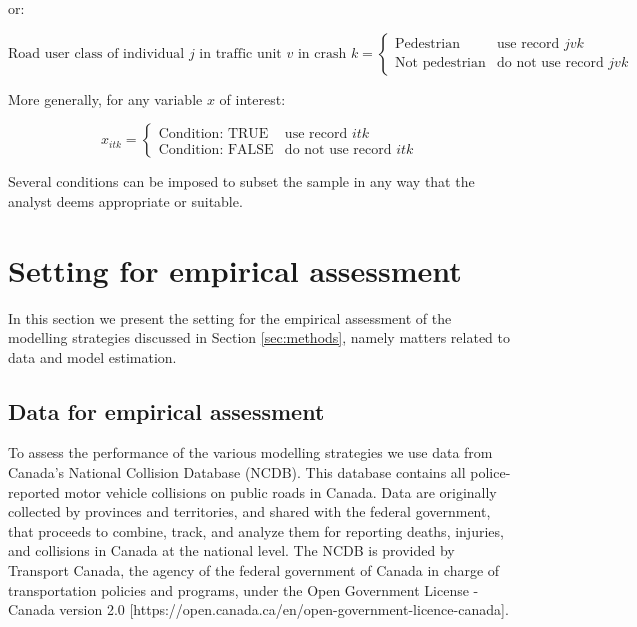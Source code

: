 \documentclass[]{elsarticle} %
\begin{document}
\noindent or:

\begin{equation}
\label{eq:sampling-pedestrian-opponent}
\text{Road user class of individual } j \text{ in traffic unit } v \text{ in crash } k = 
\begin{cases}
\text{Pedestrian} & \text{use record } jvk\\
\text{Not pedestrian} & \text{do not use record } jvk
\end{cases}
\end{equation}

More generally, for any variable \(x\) of interest:

\begin{equation}
\label{eq:sampling-general}
x_{itk} = 
\begin{cases}
\text{Condition: TRUE} & \text{use record } itk\\
\text{Condition: FALSE} & \text{do not use record } itk
\end{cases}
\end{equation}

Several conditions can be imposed to subset the sample in any way that
the analyst deems appropriate or suitable.

\hypertarget{sec:application}{%
\section{Setting for empirical assessment}\label{sec:application}}

In this section we present the setting for the empirical assessment of
the modelling strategies discussed in Section \ref{sec:methods}, namely
matters related to data and model estimation.

\hypertarget{sec:data}{%
\subsection{Data for empirical assessment}\label{sec:data}}

To assess the performance of the various modelling strategies we use
data from Canada's National Collision Database (NCDB). This database
contains all police-reported motor vehicle collisions on public roads in
Canada. Data are originally collected by provinces and territories, and
shared with the federal government, that proceeds to combine, track, and
analyze them for reporting deaths, injuries, and collisions in Canada at
the national level. The NCDB is provided by Transport Canada, the agency
of the federal government of Canada in charge of transportation policies
and programs, under the Open Government License - Canada version 2.0
{[}https://open.canada.ca/en/open-government-licence-canada{]}.
\end{document}
